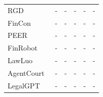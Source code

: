 \begin{table}[t]
{\begin{tabular}{lccccc}
        RGD~\citep{jin2024rgd}& - & - & - & - & - \\

        FinCon~\citep{yu2024fincon}& - & - & - & - & - \\

        PEER~\citep{wang2024peer}& - & - & - & - & - \\

        FinRobot~\citep{yang2024finrobot}& - & - & - & - & - \\

        LawLuo~\citep{sun2024lawluo}& - & - & - & - & - \\

        AgentCourt~\citep{chen2024agentcourt}& - & - & - & - & - \\

        LegalGPT~\citep{shi2024legalgpt}& - & - & - & - & - \\
        
        
        
        \bottomrule
    \end{tabular}
    }
    \label{tab:self-evolving-methods}
\end{table}
\fi 



